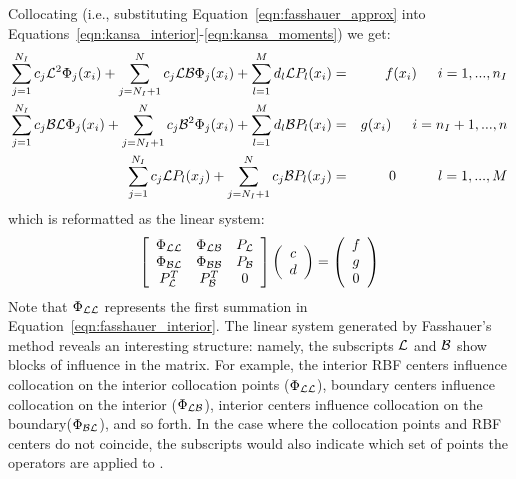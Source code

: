 \documentclass{report}
\begin{document}
{Collocating (i.e., substituting Equation~\ref{eqn:fasshauer_approx} into Equations~\ref{eqn:kansa_interior}-\ref{eqn:kansa_moments}) we get: 
\begin{eqnarray}
\sum_{j=1}^{N_I}c_j\mathcal{L}^2{\Phi_j(x_i)} + \sum_{j=N_I+1}^{N}c_j\mathcal{L}\mathcal{B}\Phi_j(x_i) + \sum_{l=1}^{M}d_l \mathcal{L}P_l(x_i) &=&f(x_i)  \hskip1.5em i = 1,...,n_I  \label{eqn:fasshauer_interior} \\ 
\sum_{j=1}^{N_I}c_j\mathcal{B}\mathcal{L}\Phi_j(x_i) + \sum_{j=N_I+1}^{N}c_j\mathcal{B}^2{\Phi_j(x_i)} + \sum_{l=1}^{M}d_l \mathcal{B}P_l(x_i) &=& g(x_i)  \hskip1.5em i = n_I + 1,..., n \label{eqn:fasshauer_boundary} \\
\sum_{j=1}^{N_I} c_j \mathcal{L}P_l(x_j) + \sum_{j=N_I + 1}^{N} c_j \mathcal{B}P_l(x_j) &=& 0 \hskip3.0em l=1,...,M \label{eqn:fasshauer_moments} 
\end{eqnarray}
which is reformatted as the linear system: 
\begin{eqnarray}
\left[ \begin{array}{c c c} 
	\Phi_{\mathcal{L}\mathcal{L}} & \Phi_{\mathcal{L}\mathcal{B}} & P_{\mathcal{L}} \\
	\Phi_{\mathcal{B}\mathcal{L}} & \Phi_{\mathcal{B}\mathcal{B}} & P_{\mathcal{B}} \\
	P^T_{\mathcal{L}} & P^T_{\mathcal{B}} & 0 \\
	\end{array} \right] \left( \begin{array}{c}
							{c} \\
							{d}
							 \end{array}
						 \right) = \left( \begin{array}{c}
							{f} \\
							{g} \\
							0
							 \end{array}
						 \right) 
	\label{eqn:fasshauer_method}
\end{eqnarray}
Note that $\Phi_{\mathcal{L}\mathcal{L}}$ represents the first summation in Equation~\ref{eqn:fasshauer_interior}. The linear system generated by Fasshauer's method reveals an interesting structure: namely, the subscripts $\mathcal{L}$ and $\mathcal{B}$ show blocks of influence in the matrix. For example, the interior RBF centers influence collocation on the interior collocation points ($\Phi_{\mathcal{L}\mathcal{L}}$), boundary centers influence collocation on the interior ($\Phi_{\mathcal{L}\mathcal{B}}$), interior centers influence collocation on the boundary($\Phi_{\mathcal{B}\mathcal{L}}$), and so forth. In the case where the collocation points and RBF centers do not coincide, the subscripts would also indicate which set of points the operators are applied to \cite{Stevens2009b}. 

}
\end{document}
